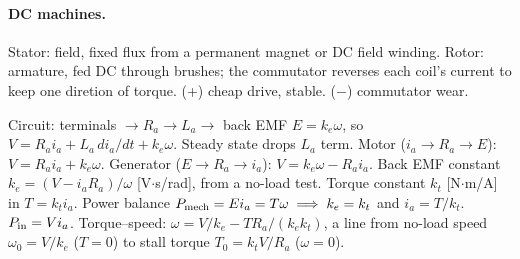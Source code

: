 \documentclass{article}
\begin{document}
\paragraph{DC machines.}
Stator: field, fixed flux from a permanent magnet or DC field winding. 
Rotor: armature, fed DC through brushes; the commutator reverses each coil's current to keep one diretion of torque.
(+) cheap drive, stable. ($-$) commutator wear.

Circuit: terminals $\to R_a \to L_a \to$ back EMF $E = k_e\omega$, so $V = R_a i_a + L_a\,di_a/dt + k_e\omega$.
Steady state drops $L_a$ term.
Motor ($i_a \to R_a\to E$): $V = R_a i_a + k_e\omega$. 
Generator ($E\to R_a\to i_a$): $V = k_e\omega - R_a i_a$.
Back EMF constant $k_e = (V - i_a R_a)/\omega$ [V$\cdot$s/rad], from a no-load test. Torque constant $k_t$ [N$\cdot$m/A] in $T = k_t i_a$.
Power balance $P_{\rm mech} = E i_a = T\omega \implies k_e = k_t$ and $i_a = T/k_t$.
$P_{\rm in} = Vi_a$.
Torque--speed: $\omega = V/k_e - TR_a/(k_e k_t)$, a line from no-load speed $\omega_0 = V/k_e$ ($T = 0$) to stall torque $T_0 = k_t V/R_a$ ($\omega = 0$).
\end{document}
